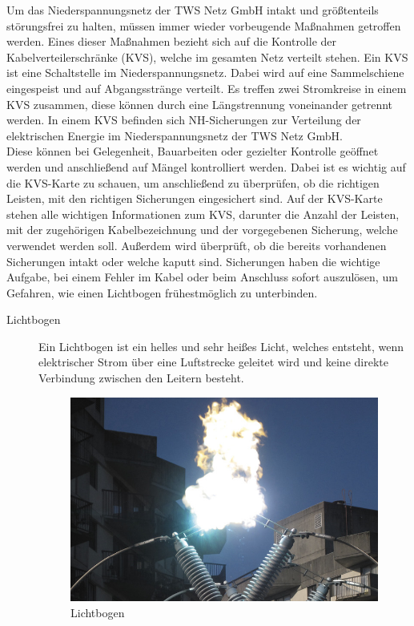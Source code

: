 Um das Niederspannungsnetz der TWS Netz GmbH intakt und größtenteils störungsfrei zu halten, müssen immer wieder vorbeugende Maßnahmen getroffen werden. 
Eines dieser Maßnahmen bezieht sich auf die Kontrolle der Kabelverteilerschränke (KVS), welche im gesamten Netz verteilt stehen. Ein KVS ist eine Schaltstelle
im Niederspannungsnetz. Dabei wird auf eine Sammelschiene eingespeist und auf Abgangsstränge verteilt. Es treffen zwei Stromkreise in einem KVS zusammen, diese
können durch eine Längstrennung voneinander getrennt werden. In einem KVS befinden sich NH-Sicherungen zur Verteilung der elektrischen Energie im 
Niederspannungsnetz der TWS Netz GmbH.
\\
Diese können bei Gelegenheit, Bauarbeiten oder 
gezielter Kontrolle geöffnet werden und anschließend auf Mängel kontrolliert werden. Dabei ist es wichtig auf die KVS-Karte zu schauen, um anschließend zu 
überprüfen, ob die richtigen Leisten, mit den richtigen Sicherungen eingesichert sind. Auf der KVS-Karte stehen alle wichtigen Informationen zum KVS, darunter
die Anzahl der Leisten, mit der zugehörigen Kabelbezeichnung und der vorgegebenen Sicherung, welche verwendet werden soll.  Außerdem wird überprüft, ob die 
bereits vorhandenen Sicherungen intakt oder welche kaputt sind. Sicherungen haben die wichtige Aufgabe, bei einem Fehler im Kabel oder beim Anschluss sofort 
auszulösen, um Gefahren, wie einen Lichtbogen frühestmöglich zu unterbinden. 
\begin{description}
\item[Lichtbogen] Ein Lichtbogen ist ein helles und sehr heißes Licht, welches entsteht, wenn elektrischer Strom über eine Luftstrecke geleitet wird und 
keine direkte Verbindung zwischen den Leitern besteht.
\begin{figure}[hbt]
\centering
\includegraphics[width=0.87\linewidth]{images/Lichtbogen}
\caption[Lichtbogen]{Lichtbogen \autocite{Lichtbogen}}
\label{fig:Lichtbogen}
\end{figure}
\end{description}
